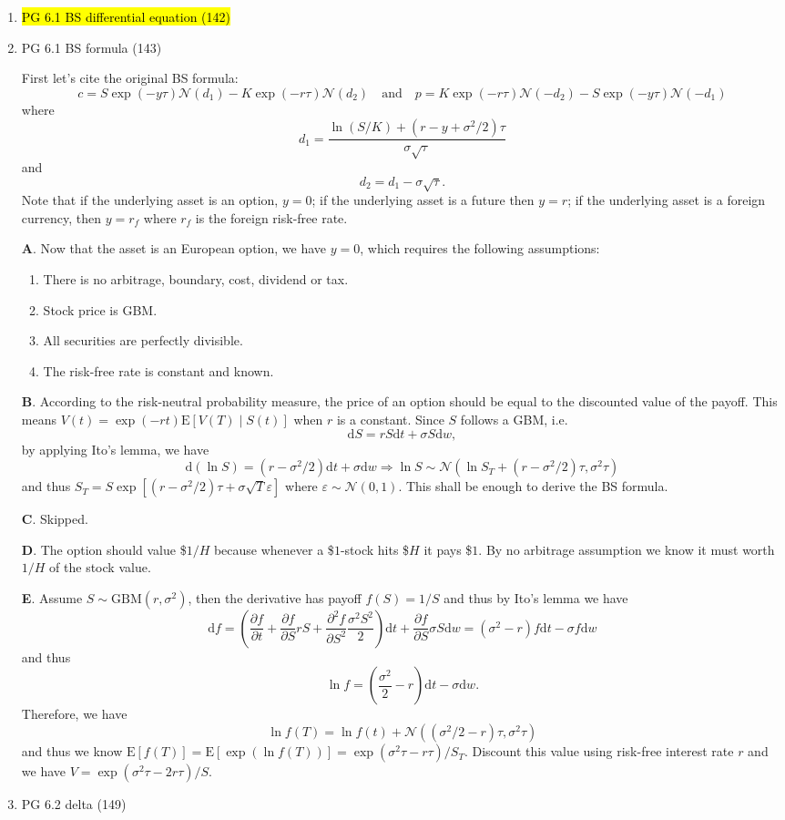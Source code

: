 \documentclass[11pt]{article}
\newcommand{\E}{\text{E}}
\newcommand{\bs}{\boldsymbol}
\renewcommand{\d}{\text{d}}
\renewcommand{\epsilon}{\varepsilon}
\newenvironment{note}{\begin{enumerate}[leftmargin=1em,topsep=0pt,noitemsep]}{\end{enumerate}}
\newenvironment{nnote}{\begin{enumerate}[leftmargin=.95em,topsep=0pt,noitemsep,label=$\bs{\cdot}$]}{\end{enumerate}}
\newcommand{\solution}{\boxed{\textbf{SOLUTION}}\hspace{.5em}}
\begin{document}
\begin{spacing}{1.1}
\begin{note}
\item \hl{PG 6.1 BS differential equation (142)}

\item PG 6.1 BS formula (143)

\solution First let's cite the original BS formula:
$$
c = S\exp(-y\tau)\mathcal{N}(d_1) - K\exp(-r\tau)\mathcal{N}(d_2)\quad \text{and}\quad p = K\exp(-r\tau)\mathcal{N}(-d_2) - S\exp(-y\tau)\mathcal{N}(-d_1)
$$
where
$$
d_1 = \frac{\ln(S/K) + (r-y+\sigma^2/2)\tau}{\sigma\sqrt{\tau}}
$$
and
$$
d_2 = d_1 - \sigma\sqrt{\tau}.
$$
Note that if the underlying asset is an option, $y=0$; if the underlying asset is a future then $y=r$; if the underlying asset is a foreign currency, then $y=r_f$ where $r_f$ is the foreign risk-free rate.

\textbf{A}. Now that the asset is an European option, we have $y=0$, which requires the following assumptions:
\begin{nnote}
\item There is no arbitrage, boundary, cost, dividend or tax.
\item Stock price is GBM.
\item All securities are perfectly divisible.
\item The risk-free rate is constant and known.
\end{nnote}

\textbf{B}. According to the risk-neutral probability measure, the price of an option should be equal to the discounted value of the payoff. This means $V(t) = \exp(-rt)\E[V(T)\mid S(t)]$ when $r$ is a constant. Since $S$ follows a GBM, i.e.
$$
\d S = rS\d t + \sigma S\d w,
$$
by applying Ito's lemma, we have
$$
\d (\ln S) = (r - \sigma^2/2)\d t + \sigma\d w\Rightarrow \ln S\sim\mathcal{N}(\ln S_T + (r - \sigma^2/2)\tau, \sigma^2\tau)
$$
and thus $S_T = S\exp[(r-\sigma^2/2)\tau + \sigma\sqrt{T}\epsilon]$ where $\epsilon\sim\mathcal{N}(0,1)$. This shall be enough to derive the BS formula. 

\textbf{C}. Skipped.

\textbf{D}. The option should value \$$1/H$ because whenever a \$$1$-stock hits \$$H$ it pays \$$1$. By no arbitrage assumption we know it must worth $1/H$ of the stock value.      

\textbf{E}. Assume $S\sim\text{GBM}(r, \sigma^2)$, then the derivative has payoff $f(S) = 1/S$ and thus by Ito's lemma we have
$$
\d f = \left(\frac{\partial f}{\partial t} + \frac{\partial f}{\partial S}r S + \frac{\partial^2 f}{\partial S^2}\frac{\sigma^2 S^2}{2}\right)\d t + \frac{\partial f}{\partial S}\sigma S\d w = (\sigma^2 - r)f \d t - \sigma f \d w
$$
and thus
$$
\ln f = \left(\frac{\sigma^2}{2} - r\right)\d t - \sigma\d w.
$$
Therefore, we have 
$$
\ln f(T) = \ln f(t) + \mathcal{N}((\sigma^2/2 - r)\tau, \sigma^2\tau)
$$
and thus we know $\E[f(T)] = \E[\exp(\ln f(T))] = \exp(\sigma^2 \tau  - r \tau) / S_T$. Discount this value using risk-free interest rate $r$ and we have $V = \exp(\sigma^2\tau -2r\tau) / S$.
\item PG 6.2 delta (149)


\end{note}
\end{spacing}
\end{document}
